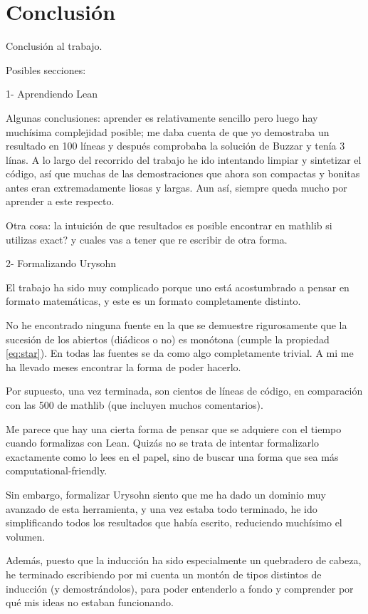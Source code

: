 \section{Conclusión}

Conclusión al trabajo.

Posibles secciones:

1- Aprendiendo Lean

Algunas conclusiones: aprender es relativamente sencillo pero luego hay muchísima complejidad posible; me daba cuenta de que yo demostraba un resultado en 100 líneas y después comprobaba la solución de Buzzar y tenía 3 línas. A lo largo del recorrido del trabajo he ido intentando limpiar y sintetizar el código, así que muchas de las demostraciones que ahora son compactas y bonitas antes eran extremadamente liosas y largas. Aun así, siempre queda mucho por aprender a este respecto.

Otra cosa: la intuición de que resultados es posible encontrar en mathlib si utilizas exact? y cuales vas a tener que re escribir de otra forma.

2- Formalizando Urysohn

El trabajo ha sido muy complicado porque uno está acostumbrado a pensar en formato matemáticas, y este es un formato completamente distinto.

No he encontrado ninguna fuente en la que se demuestre rigurosamente que la sucesión de los abiertos (diádicos o no) es monótona (cumple la propiedad \ref{eq:star}). En todas las fuentes se da como algo completamente trivial. A mi me ha llevado meses encontrar la forma de poder hacerlo.

Por supuesto, una vez terminada, son cientos de líneas de código, en comparación con las 500 de mathlib (que incluyen muchos comentarios).

Me parece que hay una cierta forma de pensar que se adquiere con el tiempo cuando formalizas con Lean. Quizás no se trata de intentar formalizarlo exactamente como lo lees en el papel, sino de buscar una forma que sea más computational-friendly.

Sin embargo, formalizar Urysohn siento que me ha dado un dominio muy avanzado de esta herramienta, y una vez estaba todo terminado, he ido simplificando todos los resultados que había escrito, reduciendo muchísimo el volumen.

Además, puesto que la inducción ha sido especialmente un quebradero de cabeza, he terminado escribiendo por mi cuenta un montón de tipos distintos de inducción (y demostrándolos), para poder entenderlo a fondo y comprender por qué mis ideas no estaban funcionando.

